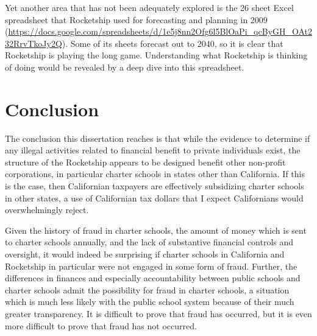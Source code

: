 Yet another area that has not been adequately explored is the 26 sheet Excel spreadsheet that Rocketship used for forecasting and planning in 2009 (\url{https://docs.google.com/spreadsheets/d/1e5j8nn2Ofg6l5BlOaPi_qcByGH_OAt232RrvTkoJy2Q}). Some of its sheets forecast out to 2040, so it is clear that Rocketship is playing the long game. Understanding what Rocketship is thinking of doing would be revealed by a deep dive into this spreadsheet.

\section{Conclusion}%
\label{sec:conclusion}\indent%

The conclusion this dissertation reaches is that while the evidence to determine if any illegal activities related to financial benefit to private individuals exist, the structure of the Rocketship appears to be designed benefit other non-profit corporations, in particular charter schools in states other than California. If this is the case, then Californian taxpayers are effectively subsidizing charter schools in other states, a use of Californian tax dollars that I expect Californians would overwhelmingly reject.

Given the history of fraud in charter schools, the amount of money which is sent to charter schools annually, and the lack of substantive financial controls and oversight, it would indeed be surprising if charter schools in California and Rocketship in particular were not engaged in some form of fraud. Further, the differences in finances and especially accountability between public schools and charter schools admit the possibility for fraud in charter schools, a situation which is much less likely with the public school system because of their much greater transparency. It is difficult to prove that fraud has occurred, but it is even more difficult to prove that fraud has not occurred. 



